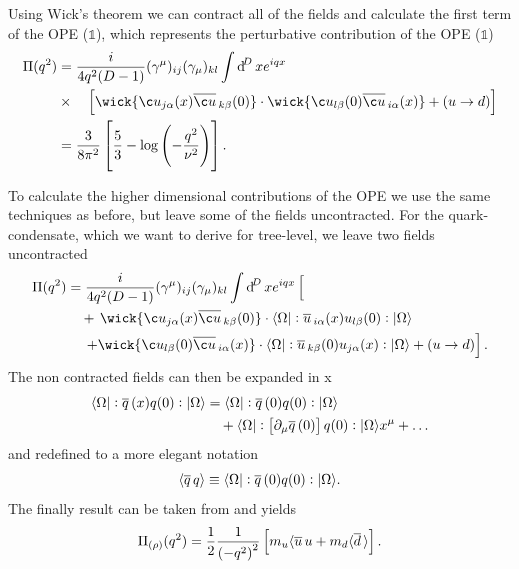 \documentclass[../../index.tex]{subfiles}
\begin{document}
Using Wick's theorem we can contract all of the fields and calculate the first
term of the OPE ($\mathbb{1}$), which represents the perturbative contribution
of the OPE ($\mathbb{1}$)
\begin{equation}
  \begin{split}
    \Pi(q^2) &= \frac{i}{4q^2(D-1)} (\gamma^\mu)_{ij} (\gamma_\mu)_{kl} \int \dif^D x e^{iqx} \\
    &\times\quad\left[ \wick{ \c u_{j \alpha}(x) \anti{\c u}_{k \beta}(0)} \cdot
      \wick{\c u_{l \beta}(0) \anti{\c u}_{i \alpha}(x)} + (u \to d)
    \right] \\
    &= \frac{3}{8\pi^2} \left[ \frac{5}{3} - \log\left( -\frac{q^2}{\nu^2}
      \right) \right].
  \end{split}
\end{equation}

To calculate the higher dimensional contributions of the OPE we use the same
techniques as before, but leave some of the fields uncontracted. For the
quark-condensate, which we want to derive for tree-level, we leave two fields
uncontracted
\begin{equation}
  \begin{split}
    \Pi(q^2) &= \frac{i}{4q^2(D-1)} (\gamma^\mu)_{ij} (\gamma_\mu)_{kl} \int \dif^D x e^{iqx} \left[ \phantom{\wick{ \c u_{j \alpha}(x) \anti{\c u}_{k \beta}(0)}} \right.\\
    &\quad+\,\wick{ \c u_{j \alpha}(x) \anti{\c u}_{k \beta}(0)} \cdot \langle \Omega \vert : \anti{u}_{i \alpha}(x) u_{l \beta} (0) :\vert \Omega \rangle \\
    &\quad\,\left.+\wick{\c u_{l \beta}(0) \anti{\c u}_{i \alpha}(x)} \cdot
      \langle \Omega \vert: \anti{u}_{k \beta}(0) u_{j \alpha}(x) : \vert \Omega
      \rangle + (u \to d) \right].
  \end{split}
\end{equation}
The non contracted fields can then be expanded in x
\begin{equation}
  \begin{split}
    \langle \Omega \vert: \overline{q}\,(x) q(0):\vert \Omega \rangle &= \langle\Omega\vert: \overline{q}\,(0) q(0): \vert\Omega\rangle\\
    &\quad+ \langle\Omega\vert:\left[ \partial_\mu \overline{q}\,(0) \right]
    q(0):\vert\Omega\rangle x^\mu + \dots
  \end{split}
\end{equation}
and redefined to a more elegant notation
\begin{equation}
  \langle \overline{q}\,q \rangle \equiv \langle\Omega\vert: \overline{q}\,(0) q(0):\vert\Omega\rangle.
\end{equation}
The finally result can be taken from \cite{Pascual1984} and yields
\begin{equation}
  \Pi_{(\rho)}(q^2) = \frac{1}{2} \frac{1}{\left(-q^2\right)^2} \left[ m_u\langle \overline{u}\, u + m_d \langle \overline{d}\, \rangle\right].
\end{equation}
\end{document}
